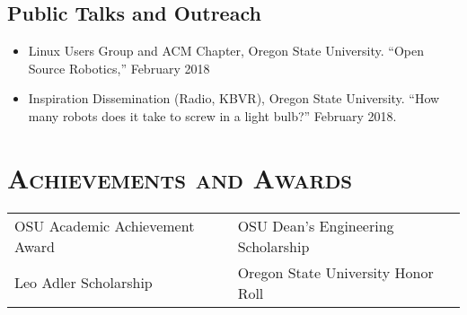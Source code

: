 \documentclass[letterpaper,10pt,titlepage]{article}
\begin{document}
\subsection*{Public Talks and Outreach}
\begin{itemize}
	\item Linux Users Group and ACM Chapter, Oregon State University. ``Open Source Robotics,'' February 2018
	\item Inspiration Dissemination (Radio, KBVR), Oregon State University. ``How many robots does it take to screw in a light bulb?'' February 2018. 
\end{itemize}

\section*{\textsc{Achievements and Awards}}
\begin{tabularx}{\linewidth}{>{\centering\arraybackslash}X|>{\centering\arraybackslash}X}
OSU Academic Achievement Award & OSU Dean's Engineering Scholarship \\
Leo Adler Scholarship & Oregon State University Honor Roll\\
\end{tabularx}
\end{document}

